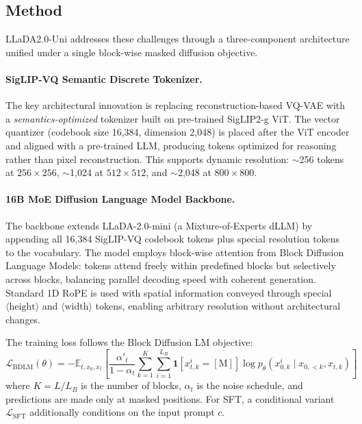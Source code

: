 \documentclass[11pt]{article}
\begin{document}
\subsection{Method}

LLaDA2.0-Uni addresses these challenges through a three-component architecture unified under a single block-wise masked diffusion objective.

\paragraph{SigLIP-VQ Semantic Discrete Tokenizer.}
The key architectural innovation is replacing reconstruction-based VQ-VAE with a \emph{semantics-optimized} tokenizer built on pre-trained SigLIP2-g ViT. The vector quantizer (codebook size 16,384, dimension 2,048) is placed after the ViT encoder and aligned with a pre-trained LLM, producing tokens optimized for reasoning rather than pixel reconstruction. This supports dynamic resolution: $\sim$256 tokens at $256 \times 256$, $\sim$1,024 at $512 \times 512$, and $\sim$2,048 at $800 \times 800$.

\paragraph{16B MoE Diffusion Language Model Backbone.}
The backbone extends LLaDA-2.0-mini (a Mixture-of-Experts dLLM) by appending all 16,384 SigLIP-VQ codebook tokens plus special resolution tokens to the vocabulary. The model employs block-wise attention from Block Diffusion Language Models: tokens attend freely within predefined blocks but selectively across blocks, balancing parallel decoding speed with coherent generation. Standard 1D RoPE is used with spatial information conveyed through special $\langle\mathrm{height}\rangle$ and $\langle\mathrm{width}\rangle$ tokens, enabling arbitrary resolution without architectural changes.

The training loss follows the Block Diffusion LM objective:
\begin{equation}
    \mathcal{L}_{\mathrm{BDLM}}(\theta) = -\mathbb{E}_{t, x_0, x_t}\!\left[\frac{\alpha'_t}{1-\alpha_t}\sum_{k=1}^{K}\sum_{i=1}^{L_B}\mathbf{1}[x_{t,k}^{i}=\mathrm{[M]}]\log p_\theta(x_{0,k}^{i}\mid x_{0,<k}, x_{t,k})\right]
\end{equation}
where $K=L/L_B$ is the number of blocks, $\alpha_t$ is the noise schedule, and predictions are made only at masked positions. For SFT, a conditional variant $\mathcal{L}_{\mathrm{SFT}}$ additionally conditions on the input prompt $c$.
\end{document}
